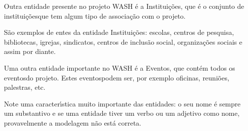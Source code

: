 \documentclass[
12pt,		%
openright,	%
twoside,  %
a4paper,			%
chapter=TITLE,		%
english,			%
french,				%
spanish,			%
brazil				%
]{USPSC-classe/USPSC}
\begin{document}
Outra entidade presente no projeto WASH \'e a \textquotedbl Institui\c{c}\~oes\textquotedbl , que \'e o conjunto de \textquotedbl institui\c{c}\~oes\textquotedbl  que tem algum tipo de associa\c{c}\~ao com o projeto.














S\~ao exemplos de entes da entidade \textquotedbl Institui\c{c}\~oes\textquotedbl : escolas, centros de pesquisa, bibliotecas, igrejas, sindicatos, centros de inclus\~ao social, organiza\c{c}\~oes sociais e assim por diante.














Uma outra entidade importante no WASH \'e a \textquotedbl Eventos\textquotedbl , que cont\'em todos os \textquotedbl eventos\textquotedbl  do projeto. Estes \textquotedbl eventos\textquotedbl  podem ser, por exemplo \textquotedbl oficinas\textquotedbl , \textquotedbl reuni\~oes\textquotedbl , \textquotedbl palestras\textquotedbl , etc.














Note uma caracter\'{\i}stica muito importante das entidades: o seu nome \'e sempre um substantivo e se uma entidade tiver um verbo ou um adjetivo como nome, provavelmente a modelagem n\~ao est\'a correta.















\noindent\begin{center}\mbox{\centering{}}\end{center}
\end{document}
